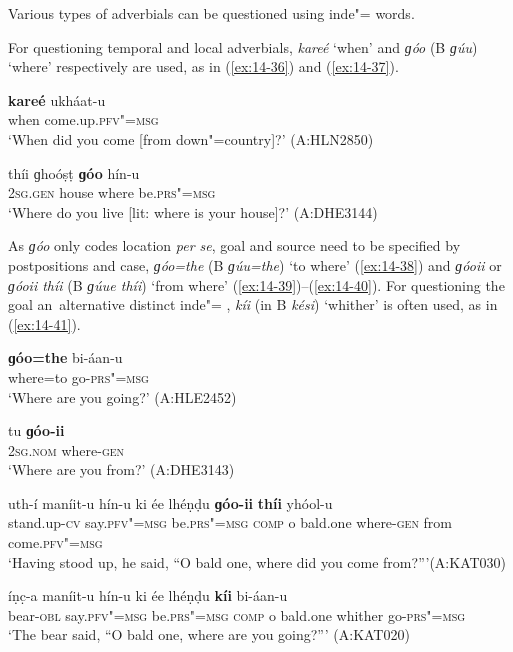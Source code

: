  Various types of adverbials can be questioned using inde"= words.


For questioning temporal and local adverbials, \textit{kareé} `when' and \textit{ɡóo} (B \textit{ɡúu}) `where' respectively are used, as in (\ref{ex:14-36}) and (\ref{ex:14-37}). 

\begin{exe}
\ex
\label{ex:14-36}
\gll \textbf{kareé} ukháat-u \\
when come.up.\textsc{pfv"=msg} \\
\glt `When did you come [from down"=country]?' (A:HLN2850)

\ex
\label{ex:14-37}
\gll thíi ɡhoóṣṭ \textbf{ɡóo} hín-u \\
\textsc{2sg.gen} house where be.\textsc{prs"=msg} \\
\glt `Where do you live [lit: where is your house]?' (A:DHE3144)
\end{exe}

As \textit{ɡóo} only codes location \textit{per se}, goal and source need to be specified by postpositions and case, \textit{ɡóo=the} (B \textit{ɡúu=the}) `to where' (\ref{ex:14-38}) and \textit{ɡóoii} or \textit{ɡóoii thíi} (B \textit{ɡúue thíi}) `from where' (\ref{ex:14-39})--(\ref{ex:14-40}). For questioning the goal an~alternative distinct inde"= , \textit{kíi} (in B \textit{kési}) `whither' is often used, as in (\ref{ex:14-41}).

\begin{exe}
\ex
\label{ex:14-38}
\gll \textbf{ɡóo=the} bi-áan-u \\
where=to go-\textsc{prs"=msg } \\
\glt `Where are you going?' (A:HLE2452)

\ex
\label{ex:14-39}
\gll tu \textbf{ɡóo-ii} \\
\textsc{2sg.nom} where-\textsc{gen}  \\
\glt `Where are you from?' (A:DHE3143)

\ex
\label{ex:14-40}
\gll uth-í maníit-u hín-u ki ée lhéṇḍu \textbf{ɡóo-ii} \textbf{thíi} yhóol-u \\
stand.up-\textsc{cv} say.\textsc{pfv"=msg} be.\textsc{prs"=msg} \textsc{comp} o bald.one where-\textsc{gen} from come.\textsc{pfv"=msg} \\
\glt `Having stood up, he said, ``O bald one, where did you come from?'''\newline (A:KAT030)

\ex
\label{ex:14-41}
\gll íṇc̣-a maníit-u hín-u ki ée lhéṇḍu \textbf{kíi} bi-áan-u \\
bear-\textsc{obl} say.\textsc{pfv"=msg} be.\textsc{prs"=msg} \textsc{comp} o bald.one whither go-\textsc{prs"=msg} \\
\glt `The bear said, ``O bald one, where are you going?''' (A:KAT020)
\end{exe}

